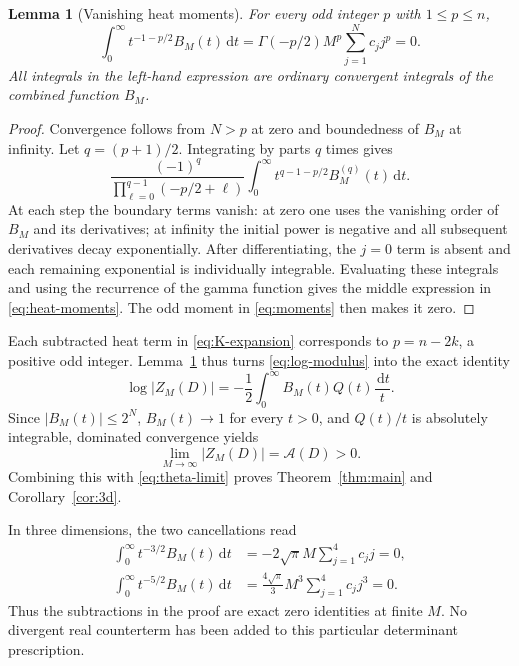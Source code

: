 \documentclass[11pt,a4paper]{article}
\newtheorem{lemma}[theorem]{Lemma}
\theoremstyle{remark}
\newcommand{\dd}{\,\mathrm d}
\numberwithin{equation}{section}
\begin{document}
\begin{lemma}[Vanishing heat moments]\label{lem:heat-moments}
For every odd integer $p$ with $1\le p\le n$,
\begin{equation}\label{eq:heat-moments}
 \int_0^\infty t^{-1-p/2}B_M(t)\dd t
 =\Gamma(-p/2)M^p\sum_{j=1}^Nc_jj^p=0.
\end{equation}
All integrals in the left-hand expression are ordinary convergent
integrals of the combined function $B_M$.
\end{lemma}
\begin{proof}
Convergence follows from $N>p$ at zero and boundedness of $B_M$ at
infinity. Let $q=(p+1)/2$. Integrating by parts $q$ times gives
\begin{equation}\label{eq:ibp}
 \frac{(-1)^q}{\prod_{\ell=0}^{q-1}(-p/2+\ell)}
 \int_0^\infty t^{q-1-p/2}B_M^{(q)}(t)\dd t.
\end{equation}
At each step the boundary terms vanish: at zero one uses the
vanishing order of $B_M$ and its derivatives; at infinity the initial
power is negative and all subsequent derivatives decay exponentially.
After differentiating, the $j=0$ term is absent and each remaining
exponential is individually integrable. Evaluating these integrals
and using the recurrence of the gamma function gives the middle
expression in \eqref{eq:heat-moments}. The odd moment in
\eqref{eq:moments} then makes it zero.
\end{proof}

Each subtracted heat term in \eqref{eq:K-expansion} corresponds to
$p=n-2k$, a positive odd integer. Lemma~\ref{lem:heat-moments} thus
turns \eqref{eq:log-modulus} into the exact identity
\begin{equation}\label{eq:modulus-Q}
 \log|Z_M(D)|=-\frac12\int_0^\infty B_M(t)Q(t)\frac{\dd t}{t}.
\end{equation}
Since $|B_M(t)|\le2^N$, $B_M(t)\to1$ for every $t>0$, and
$Q(t)/t$ is absolutely integrable, dominated convergence yields
\begin{equation}\label{eq:modulus-limit}
 \lim_{M\to\infty}|Z_M(D)|=\mathcal A(D)>0.
\end{equation}
Combining this with \eqref{eq:theta-limit} proves
Theorem~\ref{thm:main} and Corollary~\ref{cor:3d}.

In three dimensions, the two cancellations read
\begin{align}
 \int_0^\infty t^{-3/2}B_M(t)\dd t
 &=-2\sqrt\pi M\sum_{j=1}^4c_jj=0,\label{eq:3d-moment1}\\
 \int_0^\infty t^{-5/2}B_M(t)\dd t
 &=\frac{4\sqrt\pi}{3}M^3\sum_{j=1}^4c_jj^3=0.
 \label{eq:3d-moment3}
\end{align}
Thus the subtractions in the proof are exact zero identities at
finite $M$. No divergent real counterterm has been added to this
particular determinant prescription.
\end{document}
